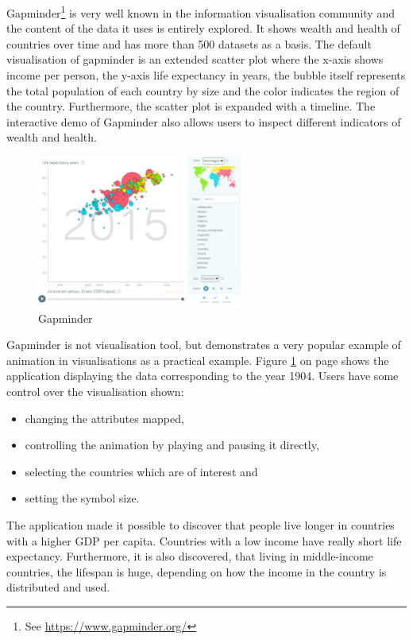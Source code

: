 Gapminder\footnote{See \href{https://www.gapminder.org/}{https://www.gapminder.org/}} is very well known in the information visualisation community and the content of the data it uses is entirely explored. It shows wealth and health of countries over time and has more than 500 datasets as a basis. The default visualisation of gapminder is an extended scatter plot where the x-axis shows income per person, the y-axis life expectancy in years, the bubble itself represents the total population of each country by size and the color indicates the region of the country. Furthermore, the scatter plot is expanded with a timeline. The interactive demo of Gapminder also allows users to inspect different indicators of wealth and health.

\begin{figure}[!htb]
\centering
\includegraphics[height=5cm]{images/methods/related/gapminder.png}
\caption[
    Gapminder
]{Gapminder}
\label{fig:gapminder}
\end{figure}

Gapminder is not visualisation tool, but demonstrates a very popular example of animation in visualisations as a practical example. Figure \ref{fig:gapminder} on page \pageref{fig:gapminder} shows the application displaying the data corresponding to the year 1904. Users have some control over the visualisation shown:
\begin{itemize}
\item changing the attributes mapped,
\item controlling the animation by playing and pausing it directly,
\item selecting the countries which are of interest and
\item setting the symbol size.
\end{itemize}

The application made it possible to discover that people live longer in countries with a higher \ac{GDP} per capita. Countries with a low income have really short life expectancy. Furthermore, it is also discovered, that living in middle-income countries, the lifespan is huge, depending on how the income in the country is distributed and used.